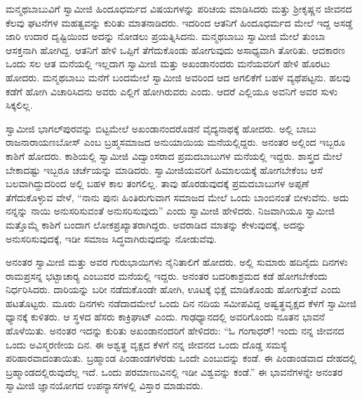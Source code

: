 ಮನ್ಮಥಬಾಬುವಿಗೆ ಸ್ವಾಮೀಜಿ ಹಿಂದೂಧರ್ಮದ ವಿಷಯಗಳನ್ನು ಪರಿಚಯ ಮಾಡಿಸಿದರು ಮತ್ತು ಶ‍್ರೀಕೃಷ್ಣನ ಜೀವನದ ಕೆಲವು ಘಟನೆಗಳ ಮಹತ್ವವನ್ನು ಕುರಿತು ಮಾತನಾಡಿದರು. ಇದರಿಂದ ಆತನಿಗೆ ಹಿಂದೂಧರ್ಮದ ಮೇಲೆ ಇದ್ದ ಅಸಡ್ಡೆ ಜಾರಿ ಉದಾರ ದೃಷ್ಟಿಯಿಂದ ಅದನ್ನು ನೋಡಲು ಪ್ರಯತ್ನಿಸಿದನು. ಮನ್ಮಥಬಾಬು ಸ್ವಾಮೀಜಿ ಮೇಲೆ ತುಂಬಾ ಆಸಕ್ತನಾಗಿ ಹೋಗಿದ್ದ. ಆತನಿಗೆ ಹೇಳಿ ಒಪ್ಪಿಗೆ ತೆಗೆದುಕೊಂಡು ಹೋಗುವುದು ಅಸಾಧ್ಯವಾಗಿ ತೋರಿತು. ಆದಕಾರಣ ಒಂದು ಸಲ ಆತ ಮನೆಯಲ್ಲಿ ಇಲ್ಲದಾಗ ಸ್ವಾಮೀಜಿ ಮತ್ತು ಅಖಂಡಾನಂದರು ಮನೆಯವರಿಗೆ ಹೇಳಿ ಹೊರಟು ಹೋದರು. ಮನ್ಮಥಬಾಬು ಮನೆಗೆ ಬಂದಮೇಲೆ ಸ್ವಾಮೀಜಿ ಅವರಿಂದ ಆದ ಅಗಲಿಕೆಗೆ ಬಹಳ ವ್ಯಥೆಪಟ್ಟನು. ಹಲವು ಕಡೆಗೆ ಹೋಗಿ ವಿಚಾರಿಸಿದನು ಅವರು ಎಲ್ಲಿಗೆ ಹೋಗಿರುವರು ಎಂದು. ಆದರೆ ಎಲ್ಲಿಯೂ ಅವನಿಗೆ ಅವರ ಸುಳು ಸಿಕ್ಕಲಿಲ್ಲ. 

 ಸ್ವಾಮೀಜಿ ಭಾಗಲ್‍ಪುರವನ್ನು ಬಿಟ್ಟಮೇಲೆ ಅಖಂಡಾನಂದರೊಡನೆ ವೈದ್ಯನಾಥಕ್ಕೆ ಹೋದರು. ಅಲ್ಲಿ ಬಾಬು ರಾಜನಾರಾಯಣಬೋಸ್ ಎಂಬ ಬ್ರಹ್ಮಸಮಾಜದ ಅನುಯಾಯಿಯ ಮನೆಯಲ್ಲಿದ್ದರು. ಅನಂತರ ಅಲ್ಲಿಂದ ಇಬ್ಬರೂ ಕಾಶಿಗೆ ಹೋದರು. ಕಾಶಿಯಲ್ಲಿ ಸ್ವಾಮೀಜಿ ವಿದ್ವಾಂಸರಾದ ಪ್ರಮದಬಾಬುಗಳ ಮನೆಯಲ್ಲಿ ಇದ್ದರು. ಶಾಸ್ತ್ರದ ಮೇಲೆ ಬೇಕಾದಷ್ಟು ಇಬ್ಬರೂ ಚರ್ಚೆಯನ್ನು ಮಾಡಿದರು. ಸ್ವಾಮೀಜಿಯವರಿಗೆ ಹಿಮಾಲಯಕ್ಕೆ ಹೋಗಬೇಕೆಂಬ ಆಸೆ ಬಲವಾಗಿದ್ದುದರಿಂದ ಅಲ್ಲಿ ಬಹಳ ಕಾಲ ತಂಗಲಿಲ್ಲ. ತಾವು ಹೊರಡುವುದಕ್ಕೆ ಪ್ರಮದಬಾಬುಗಳ ಅಪ್ಪಣೆ ತೆಗೆದುಕೊಳ್ಳುವ ವೇಳೆ, “ನಾನು ಪುನಃ ಹಿಂತಿರುಗುವಾಗ ಸಮಾಜದ ಮೇಲೆ ಒಂದು ಬಾಂಬಿನಂತೆ ಬೀಳುವೆನು. ಅದು ನನ್ನನ್ನು ನಾಯಿ ಅನುಸರಿಸುವಂತೆ ಅನುಸರಿಸುವುದು” ಎಂದು ಸ್ವಾಮೀಜಿ ಹೇಳಿದರು. ನಿಜವಾಗಿಯೂ ಸ್ವಾಮೀಜಿ ಮತ್ತೊಮ್ಮೆ ಕಾಶಿಗೆ ಬಂದಾಗ ಲೋಕಪ್ರಖ್ಯಾತರಾಗಿದ್ದರು. ಅವರಾಡಿದ ಮಾತನ್ನು ಕೇಳುವುದಕ್ಕೆ, ಅದನ್ನು ಅನುಸರಿಸುವುದಕ್ಕೆ, ಇಡೀ ಸಮಾಜ ಸಿದ್ಧವಾಗಿರುವುದನ್ನು ನೋಡುವೆವು. 

ಅನಂತರ ಸ್ವಾಮೀಜಿ ಮತ್ತು ಅವರ ಗುರುಭಾಯಿಗಳು ನೈನಿತಾಲಿಗೆ ಹೋದರು. ಅಲ್ಲಿ ಸುಮಾರು ಹದಿನೈದು ದಿನಗಳು ರಾಮಪ್ರಸನ್ನ ಭಟ್ಟಾಚಾರ‍್ಯ ಎಂಬುವರ ಮನೆಯಲ್ಲಿ ಇದ್ದರು. ಅನಂತರ ಬದರಿಕಾಶ್ರಮದ ಕಡೆ ಹೋಗಬೇಕೆಂದು ನಿರ್ಧರಿಸಿದರು. ದಾರಿಯನ್ನು ಬರೀ ನಡೆದುಕೊಂಡೇ ಹೋಗಿ, ಊಟಕ್ಕೆ ಭಿಕ್ಷೆ ಮಾಡಿಕೊಂಡು ಹೋಗುತ್ತೇವೆ ಎಂದು ಹಟತೊಟ್ಟರು. ಮೂರು ದಿನಗಳು ನಡೆದಾದಮೇಲೆ ಒಂದು ದಿನ ನದಿಯ ಸಮೀಪವಿದ್ದ ಅಷ್ವತ್ಥವೃಕ್ಷದ ಕೆಳಗೆ ಸ್ವಾಮೀಜಿ ಧ್ಯಾನಕ್ಕೆ ಕುಳಿತರು. ಆ ಸ್ಥಳದ ಹೆಸರು ಕಾಕ್ರಿಘಾಟ್ ಎಂದು. ಗಾಢಧ್ಯಾನದಲ್ಲಿ ಅವರಿಗೊಂದು ನೂತನ ಭಾವನೆ ಹೊಳೆಯಿತು. ಅನಂತರ ಇದನ್ನು ಕುರಿತು ಅಖಂಡಾನಂದರಿಗೆ ಹೇಳಿದರು: “ಓ ಗಂಗಾಧರ್! ಇಂದು ನನ್ನ ಜೀವನದ ಒಂದು ಅವಿಸ್ಮರಣೀಯ ದಿನ. ಈ ಅಶ್ವತ್ಥ ವೃಕ್ಷದ ಕೆಳಗೆ ನನ್ನ ಜೀವನದ ಒಂದು ದೊಡ್ಡ ಸಮಸ್ಯೆ ಪರಿಹಾರವಾದಂತಾಯಿತು. ಬ್ರಹ್ಮಾಂಡ ಪಿಂಡಾಂಡಗಳೆರಡು ಒಂದೇ ಎಂಬುದನ್ನು ಕಂಡೆ. ಈ ಪಿಂಡಾಂಡವಾದ ದೇಹದಲ್ಲಿ ಬ್ರಹ್ಮಾಂಡದಲ್ಲಿರುವುದೆಲ್ಲ ಇದೆ. ಒಂದು ಪರಮಾಣುವಿನಲ್ಲಿ ಇಡೀ ವಿಶ್ವವನ್ನು ಕಂಡೆ.” ಈ ಭಾವನೆಗಳನ್ನೇ ಅನಂತರ ಸ್ವಾಮೀಜಿ ಜ್ಞಾನಯೋಗದ ಉಪನ್ಯಾಸಗಳಲ್ಲಿ ವಿಸ್ತಾರ ಮಾಡುವರು. 

